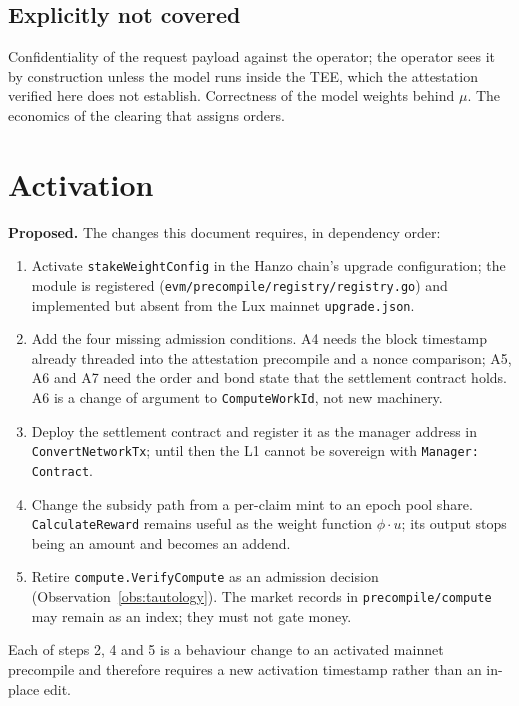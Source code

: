 \documentclass[11pt,a4paper]{article}
\theoremstyle{definition}
\theoremstyle{remark}
\newcommand{\code}[1]{\texttt{#1}}
\begin{document}
\subsection{Explicitly not covered}

Confidentiality of the request payload against the operator; the operator sees
it by construction unless the model runs inside the TEE, which the attestation
verified here does not establish. Correctness of the model weights behind $\mu$.
The economics of the clearing that assigns orders.

\section{Activation}
\label{sec:activation}

\textbf{Proposed.} The changes this document requires, in dependency order:

\begin{enumerate}[leftmargin=2.2em]
\item Activate \code{stakeWeightConfig} in the Hanzo chain's upgrade
configuration; the module is registered
(\code{evm/precompile/registry/registry.go}) and implemented but absent from the
Lux mainnet \code{upgrade.json}.
\item Add the four missing admission conditions. A4 needs the block timestamp
already threaded into the attestation precompile and a nonce comparison; A5,
A6 and A7 need the order and bond state that the settlement contract holds. A6
is a change of argument to \code{ComputeWorkId}, not new machinery.
\item Deploy the settlement contract and register it as the manager address in
\code{ConvertNetworkTx}; until then the L1 cannot be sovereign with
\code{Manager: Contract}.
\item Change the subsidy path from a per-claim mint to an epoch pool share.
\code{CalculateReward} remains useful as the weight function $\phi \cdot u$;
its output stops being an amount and becomes an addend.
\item Retire \code{compute.VerifyCompute} as an admission decision
(Observation~\ref{obs:tautology}). The market records in \code{precompile/compute}
may remain as an index; they must not gate money.
\end{enumerate}

Each of steps 2, 4 and 5 is a behaviour change to an activated mainnet
precompile and therefore requires a new activation timestamp rather than an
in-place edit.
\end{document}
